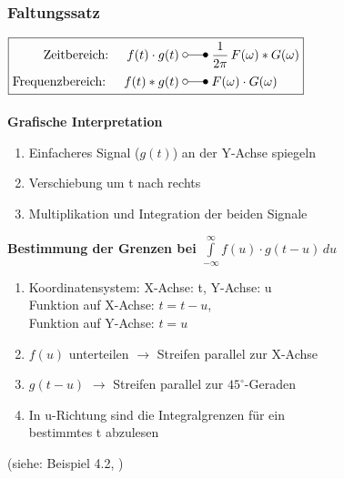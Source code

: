 	\subsubsection{Faltungssatz }
		\begin{minipage}{.45\textwidth}
				\begin{math}
				\boxed{
					\begin{aligned}
						\text{Zeitbereich: \quad} f(t)\cdot g(t) \; &\laplace \; \frac{1}{2\pi} \, F(\omega) \ast G(\omega) \\
						\text{Frequenzbereich: \quad} f(t) \ast g(t) \; &\laplace \; F(\omega) \cdot G(\omega) \\
					\end{aligned}
				}
				\end{math}\\
				\\
	
		\textbf{Grafische Interpretation}
		\begin{enumerate}
			\item Einfacheres Signal ($g(t)$) an der Y-Achse spiegeln
			\item Verschiebung um t nach rechts
			\item Multiplikation und Integration der beiden Signale
		\end{enumerate}
	\end{minipage}%
	\hspace{.1\textwidth}
	\begin{minipage}{.45\textwidth}
		\textbf{Bestimmung der Grenzen bei $\int\limits_{-\infty}^\infty f(u) \cdot g(t-u)\,du$}
		\begin{enumerate}
		  \item Koordinatensystem: X-Achse: t, Y-Achse: u\\ 
		  Funktion auf X-Achse: $t = t - u$, \\
		  Funktion auf Y-Achse: $t = u$
		  \item $f(u)$ unterteilen $\rightarrow$ Streifen parallel zur X-Achse
		  \item $g(t-u)$ $\rightarrow$ Streifen parallel zur $45^{\circ}$-Geraden
		  \item In u-Richtung sind die Integralgrenzen für ein \\ bestimmtes t abzulesen
		\end{enumerate}
		(siehe: Beispiel 4.2, {\color{red}{Skript47}})
	\end{minipage}
	
	

